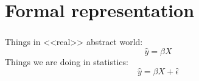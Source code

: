 \documentclass[t, 11pt]{beamer}
\begin{document}
	\section{Formal representation}

\begin{frame}
	\frametitle{\insertsection} 
	\framesubtitle{\insertsubsection} 
	
	Things in <<real>> abstract world:
	\begin{equation}
		 \hat{y} = \beta X
	\end{equation}
	Things we are doing in statistics:
	\begin{equation}
		 \hat{y} = \beta X + \hat{\epsilon}
	\end{equation} 

\end{frame}		
\end{document}
